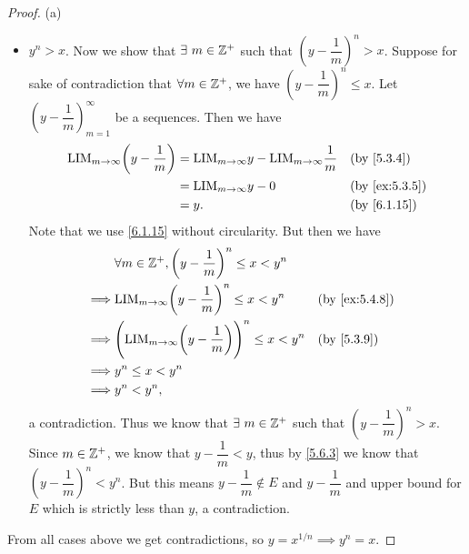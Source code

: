 \begin{proof}{(a)}
\begin{itemize}
          But this means \(y + \dfrac{1}{m} \in E\) and \(y + \dfrac{1}{m} \leq y\), a contradiction.
    \item \(y^n > x\).
          Now we show that \(\exists\ m \in \mathbb{Z}^+\) such that \((y - \dfrac{1}{m})^n > x\).
          Suppose for sake of contradiction that \(\forall m \in \mathbb{Z}^+\), we have \((y - \dfrac{1}{m})^n \leq x\).
          Let \((y - \dfrac{1}{m})_{m = 1}^\infty\) be a sequences.
          Then we have
          \begin{align*}
            \text{LIM}_{m \to \infty} \bigg(y - \dfrac{1}{m}\bigg) & = \text{LIM}_{m \to \infty} y - \text{LIM}_{m \to \infty} \dfrac{1}{m} &  & \by{5.3.4}                  \\
                                                                   & = \text{LIM}_{m \to \infty} y - 0                                      &  & \text{(by \cref{ex:5.3.5})} \\
                                                                   & = y.                                                                   &  & \text{(by \cref{6.1.15})}
          \end{align*}
          Note that we use \cref{6.1.15} without circularity.
          But then we have
          \begin{align*}
                     & \forall m \in \Z^+, \bigg(y - \dfrac{1}{m}\bigg)^n \leq x < y^n                                                    \\
            \implies & \text{LIM}_{m \to \infty} \bigg(y - \dfrac{1}{m}\bigg)^n \leq x < y^n             &  & \text{(by \cref{ex:5.4.8})} \\
            \implies & \Bigg(\text{LIM}_{m \to \infty} \bigg(y - \dfrac{1}{m}\bigg)\Bigg)^n \leq x < y^n &  & \by{5.3.9}                  \\
            \implies & y^n \leq x < y^n                                                                                                   \\
            \implies & y^n < y^n,
          \end{align*}
          a contradiction.
          Thus we know that \(\exists\ m \in \mathbb{Z}^+\) such that \((y - \dfrac{1}{m})^n > x\).
          Since \(m \in \mathbb{Z}^+\), we know that \(y - \dfrac{1}{m} < y\), thus by \cref{5.6.3} we know that \((y - \dfrac{1}{m})^n < y^n\).
          But this means \(y - \dfrac{1}{m} \notin E\) and \(y - \dfrac{1}{m}\) and upper bound for \(E\) which is strictly less than \(y\), a contradiction.
  \end{itemize}
  From all cases above we get contradictions, so \(y = x^{1 / n} \implies y^n = x\).
\end{proof}

